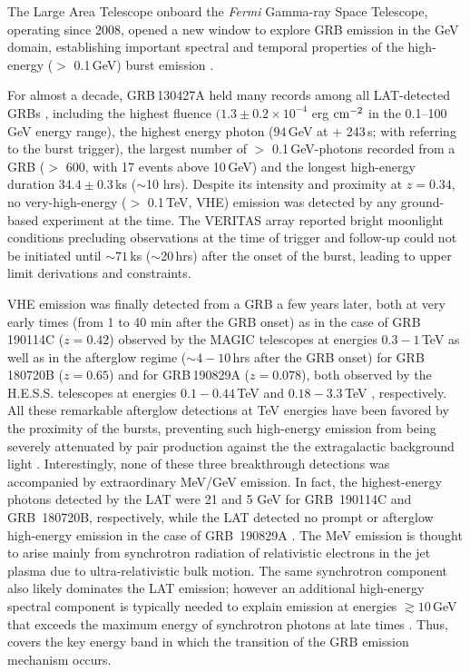 \documentclass[preprint]{aastex631}
\begin{document}
The Large Area Telescope \citep[LAT,][]{2009ApJ...697.1071A} onboard the {\it Fermi} Gamma-ray Space Telescope, operating since 2008, opened a new window to explore GRB emission in the GeV domain, establishing important spectral and temporal properties of the high-energy ($>$ 0.1\,GeV) burst emission \citep{2FLGC}.

For almost a decade, GRB\,130427A held many records among all LAT-detected GRBs \citep{2014Sci...343...42A}, including the highest fluence $(1.3 \pm 0.2 \times 10^{-4}$ erg $\rm{cm}^{-2}$ in the 0.1--100 GeV energy range), the highest energy photon ($94$\,GeV at \trig+ 243\,s; with \trig referring to the burst trigger), the largest number of $>$ 0.1\,GeV-photons recorded from a GRB ($>$  600, with 17 events above 10\,GeV) and the longest high-energy duration $34.4 \pm 0.3$\,ks ($\sim$10 hrs). Despite its intensity and proximity at $z=0.34$, no very-high-energy ($>$ 0.1\,TeV, VHE) emission was detected by any ground-based experiment at the time. 
The VERITAS array reported bright moonlight conditions precluding observations at the time of trigger \citep{2014ApJ...795L...3A} and follow-up could not be initiated until $\sim 71$\,ks ($\sim$20\,hrs) after the onset of the burst, leading to upper limit derivations and constraints. 

VHE emission was finally detected from a GRB a few years later, both at very early times (from 1 to 40 min after the GRB onset) as in the case of GRB\,190114C ($z=0.42$) observed by the MAGIC telescopes at energies $0.3-1$\,TeV \citep{2019Natur.575..455M} as well as in the afterglow regime ($\sim 4-10$\,hrs after the GRB onset) for GRB\,180720B ($z=0.65$) and for GRB\,190829A ($z=0.078$), both observed by the H.E.S.S. telescopes at energies $0.1-0.44$\,TeV \citep{2019Natur.575..464A} and $0.18-3.3$\,TeV \citep{2021Sci...372.1081H}, respectively. 
All these remarkable afterglow detections at TeV energies have been favored by the proximity of the bursts, preventing such high-energy emission from being severely attenuated by pair production against the the extragalactic background light \citep[EBL,][]{2010ApJ...712..238F}. Interestingly, none of these three breakthrough detections was accompanied by extraordinary MeV/GeV emission. In fact, the highest-energy photons detected by the LAT were 21 and 5 GeV for GRB~190114C and GRB~180720B, respectively, while the LAT detected no prompt or afterglow high-energy emission in the case of GRB~190829A \citep{2019GCN.25574....1P}.
The MeV emission is thought to arise mainly from synchrotron radiation of relativistic electrons in the jet plasma due to ultra-relativistic bulk motion. The same synchrotron component also likely dominates the LAT emission; however an additional high-energy spectral component is typically needed to explain emission at energies $\gtrsim10$\,GeV that exceeds the maximum energy of synchrotron photons at late times \citep{2014Sci...343...42A, 2020ApJ...890....9A}. Thus, \lat covers the key energy band in which the transition of the GRB emission mechanism occurs.
\end{document}
